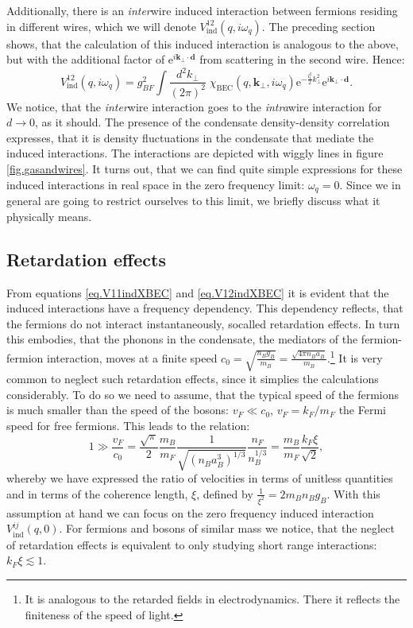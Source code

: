 Additionally, there is an \textit{inter}wire induced interaction between fermions residing in different wires, which we will denote $V_{\text{ind}}^{12}(q,i\omega_q)$. The preceding section shows, that the calculation of this induced interaction is analogous to the above, but with the additional factor of $\text{e}^{i\mathbf{k}_\perp\cdot \mathbf{d}}$ from scattering in the second wire. Hence:
\begin{equation}
V_{\text{ind}}^{12}(q,i\omega_q) = g_{BF}^2\int\frac{d^2k_\perp}{(2\pi)^2}\; \chi_\text{BEC}(q,\mathbf{k}_\perp, i\omega_q)\text{e}^{-\frac{l_t^2}{2}k_\perp^2}\text{e}^{i\mathbf{k}_\perp\cdot \mathbf{d}}. 
\label{eq.V12indXBEC} 
\end{equation}
We notice, that the \textit{inter}wire interaction goes to the \textit{intra}wire interaction for $d \to 0$, as it should. The presence of the condensate density-density correlation expresses, that it is density fluctuations in the condensate that mediate the induced interactions. The interactions are depicted with wiggly lines in figure \ref{fig.gasandwires}. It turns out, that we can find quite simple expressions for these induced interactions in real space in the zero frequency limit: $\omega_q = 0$. Since we in general are going to restrict ourselves to this limit, we briefly discuss what it physically means. 

\subsection{Retardation effects} \label{sec.RetardationEffects}
From equations \eqref{eq.V11indXBEC} and \eqref{eq.V12indXBEC} it is evident that the induced interactions have a frequency dependency. This dependency reflects, that the fermions do not interact instantaneously, socalled retardation effects. In turn this embodies, that the phonons in the condensate, the mediators of the fermion-fermion interaction, moves at a finite speed $c_0 = \sqrt{\frac{n_Bg_B}{m_B}} = \frac{\sqrt{4\pi n_B a_B}}{m_B}$.\footnote{It is analogous to the retarded fields in electrodynamics. There it reflects the finiteness of the speed of light.} It is very common to neglect such retardation effects, since it simplies the calculations considerably. To do so we need to assume, that the typical speed of the fermions is much smaller than the speed of the bosons: $v_F \ll c_0$, $v_F = k_F/m_F$ the Fermi speed for free fermions. This leads to the relation:
\begin{equation}
1 \gg \frac{v_F}{c_0} = \frac{\sqrt{\pi}}{2} \frac{m_B}{m_F}\frac{1}{ \sqrt{ (n_Ba_B^3)^{1/3} } }\frac{n_F}{ n_B^{1/3} } = \frac{m_B}{m_F}\frac{k_F\xi}{\sqrt{2}}, 
\label{eq.RetardationEffectsneglectionassumption}
\end{equation}
whereby we have expressed the ratio of velocities in terms of unitless quantities and in terms of the coherence length, $\xi$, defined by $\frac{1}{\xi^2} = 2m_Bn_Bg_B$. With this assumption at hand we can focus on the zero frequency induced interaction $V^{ij}_{\text{ind}}(q,0)$. For fermions and bosons of similar mass we notice, that the neglect of retardation effects is equivalent to only studying short range interactions: $k_F\xi \lesssim 1$. 


